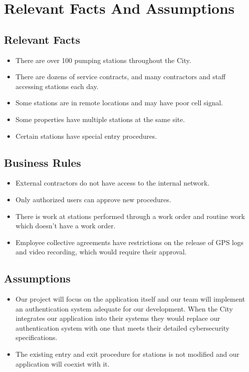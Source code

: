 \documentclass[12pt]{article}
\begin{document}
\section{Relevant Facts And Assumptions}
\subsection{Relevant Facts}
\begin{itemize}
  \item There are over 100 pumping stations throughout the City.
  \item There are dozens of service contracts, and many contractors
    and staff accessing stations each day.
  \item Some stations are in remote locations and may have poor cell signal.
  \item Some properties have multiple stations at the same site.
  \item Certain stations have special entry procedures.
\end{itemize}

\subsection{Business Rules}
\begin{itemize}
  \item External contractors do not have access to the internal network.
  \item Only authorized users can approve new procedures.
  \item There is work at stations performed through a work order
    and routine work which doesn't have a work order.
  \item Employee collective agreements have restrictions on the release of
    GPS logs and video recording, which would require their approval.
\end{itemize}
\subsection{Assumptions}
\begin{itemize}
  \item Our project will focus on the application itself
    and our team will implement an authentication system adequate for our
    development. When the City integrates our application into their systems
    they would replace our authentication system with one that meets their
    detailed cybersecurity specifications.
  \item The existing entry and exit procedure for stations is not modified
    and our application will coexist with it.
\end{itemize}
\end{document}

